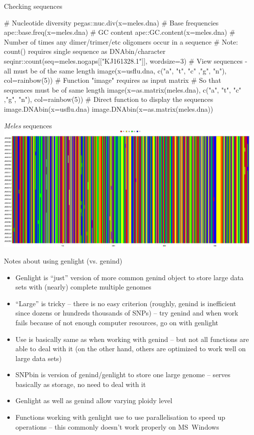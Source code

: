\documentclass[compress, ucs, xelatex, 11pt, xcolor=svgnames,
  hyperref={
    bookmarks=true,
    unicode=true,
    colorlinks=true,
    pdftitle={Molecular data in R},
    plainpages=false,
    pdfauthor={Vojtech Zeisek},
    pdfsubject={Course about phylogeny and evolution in R},
    pdfcreator={XeLaTeX},
    pdfkeywords={R, evolution, phylogeny, molecular data},
    linkcolor=Tomato,
    anchorcolor=SaddleBrown,
    citecolor=Goldenrod,
    filecolor=DarkMagenta,
    menucolor=Sienna,
    urlcolor=DarkTurquoise,
    pdftex},
  url={hyphens, lowtilde} %
  ]{beamer}
\begin{document}
\begin{frame}[fragile]{Checking sequences}
  \begin{spluscode}
    # Nucleotide diversity
    pegas::nuc.div(x=meles.dna)
    # Base frequencies
    ape::base.freq(x=meles.dna)
    # GC content
    ape::GC.content(x=meles.dna)
    # Number of times any dimer/trimer/etc oligomers occur in a sequence
    # Note: count() requires single sequence as DNAbin/character
    seqinr::count(seq=meles.nogaps[["KJ161328.1"]], wordsize=3)
    # View sequences - all must be of the same length
    image(x=usflu.dna, c("a", "t", "c" ,"g", "n"), col=rainbow(5))
    # Function "image" requires as input matrix
    # So that sequences must be of same length
    image(x=as.matrix(meles.dna), c("a", "t", "c" ,"g", "n"),
      col=rainbow(5))
    # Direct function to display the sequences
    image.DNAbin(x=usflu.dna)
    image.DNAbin(x=as.matrix(meles.dna))
  \end{spluscode}
\end{frame}

\begin{frame}{\textit{Meles} sequences}
  \includegraphics[width=\textwidth]{sequences_meles.png}
\end{frame}

\begin{frame}{Notes about using genlight (vs. genind)}
\begin{itemize}
 \item Genlight is ``just'' version of more common genind object to store large data sets with (nearly) complete multiple genomes
 \item ``Large'' is tricky -- there is no easy criterion (roughly, genind is inefficient since dozens or hundreds thousands of SNPs) -- try genind and when work fails because of not enough computer resources, go on with genlight
 \item Use is basically same as when working with genind -- but not all functions are able to deal with it (on the other hand, others are optimized to work well on large data sets)
 \item SNPbin is version of genind/genlight to store one large genome -- serves basically as storage, no need to deal with it
 \item Genlight as well as genind allow varying ploidy level
 \item Functions working with genlight use to use parallelisation to speed up operations -- this commonly doesn't work properly on MS~Windows
\end{itemize}
\end{frame}
\end{document}
